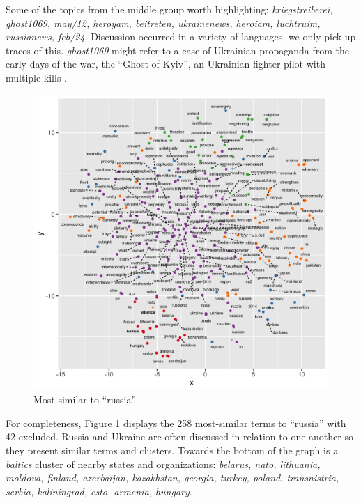 \documentclass[doublespacing]{utdthesis}
\let\cite=\citep
\begin{document}
Some of the topics from the middle group worth highlighting: \emph{kriegstreiberei, ghost1069, may/12, heroyam, beitreten, ukrainenews, heroiam, luchtruim, russianews, feb/24}.
Discussion occurred in a variety of languages, we only pick up traces of this.
\emph{ghost1069} might refer to a case of Ukrainian propaganda from the early days of the war, the ``Ghost of Kyiv'', an Ukrainian fighter pilot with multiple kills \cite{bubola2022}.

\begin{figure}[!ht]
\centering
\includegraphics[width=\textwidth]{2022/russia}
\caption{Most-similar to ``russia''}
\label{fig:russia_2022}
\end{figure}

For completeness, Figure \ref{fig:russia_2022} displays the 258 most-similar terms to ``russia'' with 42 excluded.
Russia and Ukraine are often discussed in relation to one another so they present similar terms and clusters.
Towards the bottom of the graph is a \emph{baltics} cluster of nearby states and organizations: \emph{belarus, nato, lithuania, moldova, finland, azerbaijan, kazakhstan, georgia, turkey, poland, transnistria, serbia, kaliningrad, csto, armenia, hungary}.
\end{document}
